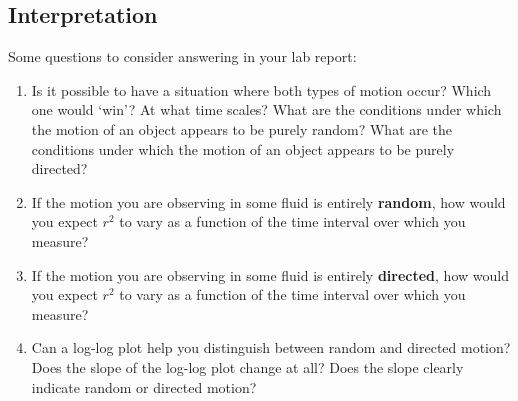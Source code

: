 \subsection*{Interpretation}
Some questions to consider answering in your lab report:
\begin{enumerate}
\item Is it possible to have a situation where both types of motion occur? Which one would ‘win'? At what time scales? What are the conditions under which the motion of an object appears to be purely random? What are the conditions under which the motion of an object appears to be purely directed? 
\item If the motion you are observing in some fluid is entirely \textbf{random}, how would you expect $r^{2}$ to vary as a function of the time interval over which you measure?
\item If the motion you are observing in some fluid is entirely \textbf{directed}, how would you expect $r^{2}$ to vary as a function of the time interval over which you measure? 
\item Can a log-log plot help you distinguish between random and directed motion? Does the slope of the log-log plot change at all? Does the slope clearly indicate random or directed motion? 
\end{enumerate}